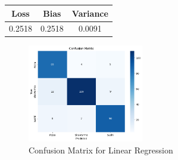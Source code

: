 \begin{table}[h]
    \centering
    \begin{tabular}{ccc}
        \hline
        Loss   & Bias   & Variance \\
        \hline
        0.2518 & 0.2518 & 0.0091   \\
        \hline
    \end{tabular}
\end{table}

\begin{figure}[h]
    \centering
    \includegraphics[width=0.45\textwidth]{params/linearregression_confusion.png}
    \caption{Confusion Matrix for Linear Regression}
\end{figure}